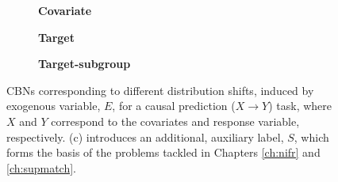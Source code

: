 \begin{figure}[]
        \centering
        \begin{subfigure}[t]{0.3\textwidth}
            \centering
            \caption{\textbf{Covariate}}
        \end{subfigure}
        \begin{subfigure}[t]{0.3\textwidth}
            \centering
            \caption{\textbf{Target}}
        \end{subfigure}
        \begin{subfigure}[t]{0.3\textwidth}
            \centering
            \caption{\textbf{Target-subgroup}}
        \end{subfigure}
    \caption{
        \acp{CBN} corresponding to different distribution shifts, induced by
        exogenous variable, \(E\), for a causal prediction (\(X \to Y \)) task, where \(X\) and
        \(Y\) correspond to the covariates and response variable, respectively.
        (c) introduces an additional, auxiliary label, \(S\), which forms the basis of the problems
        tackled in Chapters \ref{ch:nifr} and \ref{ch:supmatch}.
    }
    \label{fig:ds_cbns}
\end{figure}
